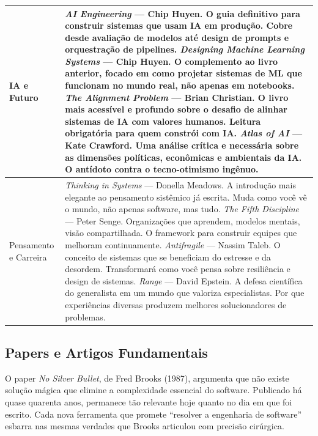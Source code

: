 \begin{table}[h]
\begin{tabular}{p{3.5cm} p{8cm}}
\midrule
IA e Futuro &
    \textit{AI Engineering} --- Chip Huyen.
    O guia definitivo para construir sistemas que usam IA em produção. Cobre desde avaliação de modelos até design de prompts e orquestração de pipelines. \newline
    \textit{Designing Machine Learning Systems} --- Chip Huyen.
    O complemento ao livro anterior, focado em como projetar sistemas de ML que funcionam no mundo real, não apenas em notebooks. \newline
    \textit{The Alignment Problem} --- Brian Christian.
    O livro mais acessível e profundo sobre o desafio de alinhar sistemas de IA com valores humanos. Leitura obrigatória para quem constrói com IA. \newline
    \textit{Atlas of AI} --- Kate Crawford.
    Uma análise crítica e necessária sobre as dimensões políticas, econômicas e ambientais da IA. O antídoto contra o tecno-otimismo ingênuo. \\
\midrule
Pensamento e Carreira &
    \textit{Thinking in Systems} --- Donella Meadows.
    A introdução mais elegante ao pensamento sistêmico já escrita. Muda como você vê o mundo, não apenas software, mas tudo. \newline
    \textit{The Fifth Discipline} --- Peter Senge.
    Organizações que aprendem, modelos mentais, visão compartilhada. O framework para construir equipes que melhoram continuamente. \newline
    \textit{Antifragile} --- Nassim Taleb.
    O conceito de sistemas que se beneficiam do estresse e da desordem. Transformará como você pensa sobre resiliência e design de sistemas. \newline
    \textit{Range} --- David Epstein.
    A defesa científica do generalista em um mundo que valoriza especialistas. Por que experiências diversas produzem melhores solucionadores de problemas. \\
\bottomrule
\end{tabular}
\end{table}

\subsection*{Papers e Artigos Fundamentais}

O paper \textit{No Silver Bullet}, de Fred Brooks (1987), argumenta que não existe solução mágica que elimine a complexidade essencial do software. Publicado há quase quarenta anos, permanece tão relevante hoje quanto no dia em que foi escrito. Cada nova ferramenta que promete ``resolver a engenharia de software'' esbarra nas mesmas verdades que Brooks articulou com precisão cirúrgica.

